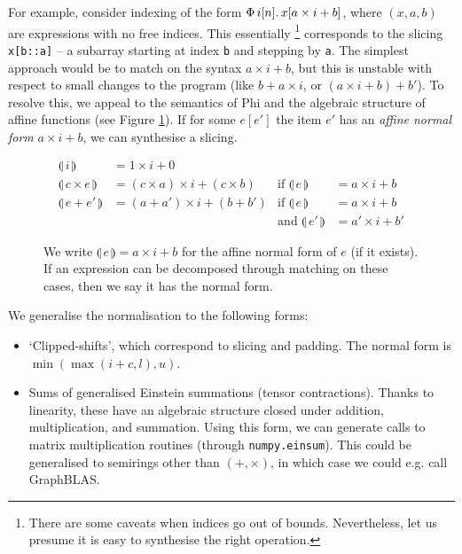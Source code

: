For example, consider indexing of the form $\Phi\, {i}[{n}] \ldotp {x[a \times i + b]}$, where $(x, a, b)$ are expressions with no free indices. This essentially%
\footnote{
There are some caveats when indices go out of bounds. Nevertheless, let us presume it is easy to synthesise the right operation.}
corresponds to the slicing \texttt{x[b::a]} -- a subarray starting at index \texttt{b} and stepping by \texttt{a}.
The simplest approach would be to match on the syntax $a \times i + b$, but this is unstable with respect to small changes to the program (like $b + a \times i$, or $(a \times i + b) + b'$).
To resolve this, we appeal to the semantics of Phi and the algebraic structure of affine functions (see Figure \ref{fig:affine-normal-forms}). 
If for some $e[e']$ the item $e'$ has an \textit{affine normal form} $a \times i + b$, we can synthesise a slicing.

\newcommand{\norma}[1]{\llparenthesis \,{#1}\, \rrparenthesis}
\begin{figure}
    \centering
\begin{align*}
\norma{i} &= 1 \times i + 0 \\
\norma{c\times e} &= (c \times a) \times i + (c \times b)
& \text{if } \norma{e} &= a \times i + b \\
\norma{e + e'} &= (a + a') \times i + (b + b')
& \text{if } \norma{e} &= a \times i + b \\
&& \text{and } \norma{e'} &= a' \times i + b'
\end{align*}
    \caption{We write $\norma{e} = a \times i + b$ for the affine normal form of $e$ (if it exists). If an expression can be decomposed through matching on these cases, then we say it has the normal form.}
    \label{fig:affine-normal-forms}
\end{figure}

We generalise the normalisation to the following forms: \begin{itemize}
    \item `Clipped-shifts', which correspond to slicing and padding. The normal form is $\min(\max(i + c, l), u)$.
    \item Sums of generalised Einstein summations (tensor contractions). Thanks to linearity, these have an algebraic structure closed under addition, multiplication, and summation. Using this form, we can generate calls to matrix multiplication routines (through \texttt{numpy.einsum}). This could be generalised to semirings other than $(+, \times)$, in which case we could e.g. call GraphBLAS.
\end{itemize}

